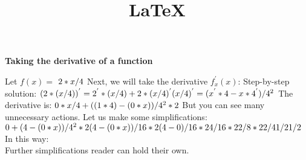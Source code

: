 \documentclass[12pt]{article}
\title{\LaTeX}
\date{}
\author{}
\begin{document}
	\begin{center}
		\Large\textbf{Taking the derivative of a function}
	\end{center}
	Let $f(x) = $
	\begin{math}
		2*x/4\\
	\end{math}
	\newline
	\newline
	Next, we will take the derivative $f^{'}_x(x)$:\newline
	\newline
	Step-by-step solution:\newline
	\begin{math}
		(2*(x/4))^{'}=2^{'}*(x/4)+2*(x/4)^{'}\\
(x/4)^{'}=(x^{'}*4-x*4^{'})/4^2\\
	\end{math}
	\newline
	The derivative is:\newline
	\begin{math}
		0*x/4+((1*4)-(0*x))/4^2*2\\
	\end{math}
	\newline
	But you can see many unnecessary actions.
	\newline
	Let us make some simplifications:\newline
	\begin{math}
		0+(4-(0*x))/4^2*2\\
		(4-(0*x))/16*2\\
		(4-0)/16*2\\
		4/16*2\\
		2/8*2\\
		2/4\\
		1/2\\
		1/2\\
	\end{math}
	\newline
	In this way:\newline
		\\	\newline
	Further simplifications reader can hold their own.\newline
\end{document}
